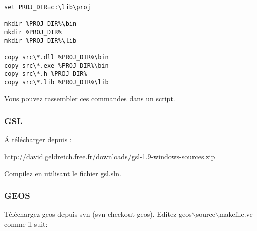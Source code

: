 \begin{verbatim}
set PROJ_DIR=c:\lib\proj

mkdir %PROJ_DIR%\bin
mkdir %PROJ_DIR%
mkdir %PROJ_DIR%\lib

copy src\*.dll %PROJ_DIR%\bin
copy src\*.exe %PROJ_DIR%\bin
copy src\*.h %PROJ_DIR%
copy src\*.lib %PROJ_DIR%\lib 
\end{verbatim}

Vous pouvez rassembler ces commandes dans un script.

% 
% 

\subsubsection{GSL}
\'A t\'el\'echarger depuis :

\url{http://david.geldreich.free.fr/downloads/gsl-1.9-windows-sources.zip}

Compilez en utilisant le fichier gsl.sln.

% 
% 
% 
% 
% 
% 

\subsubsection{GEOS}
T\'el\'echargez geos depuis svn (svn checkout  geos).
Editez geos$\backslash$source$\backslash$makefile.vc comme il suit:

